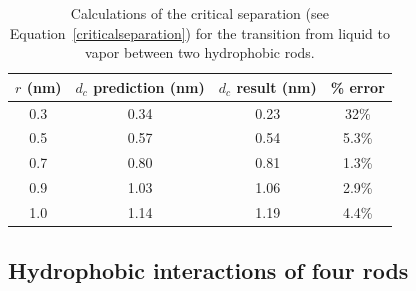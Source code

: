 \documentclass[letterpaper,twocolumn,amsmath,amssymb,prb]{revtex4-1}
\begin{document}
\begin{table}
\begin{tabular} {|c|c|c|c|}
\hline
$r$ (nm) & $d_c$ prediction (nm) & $d_c$ result (nm) & \% error \\
\hline
0.3 & 0.34 & 0.23 & 32\% \\
\hline
0.5 & 0.57 & 0.54 & 5.3\% \\
\hline
0.7 & 0.80 & 0.81 & 1.3\% \\
\hline
0.9 & 1.03 & 1.06 & 2.9\% \\
\hline
1.0 & 1.14 & 1.19 & 4.4\% \\
\hline
\end{tabular}
\caption{Calculations of the critical separation (see Equation~\ref{criticalseparation})
for the transition
from liquid to vapor between two hydrophobic rods.}
\label{criticalseparationtable}
\end{table} 

\subsection{Hydrophobic interactions of four rods}
\end{document}
